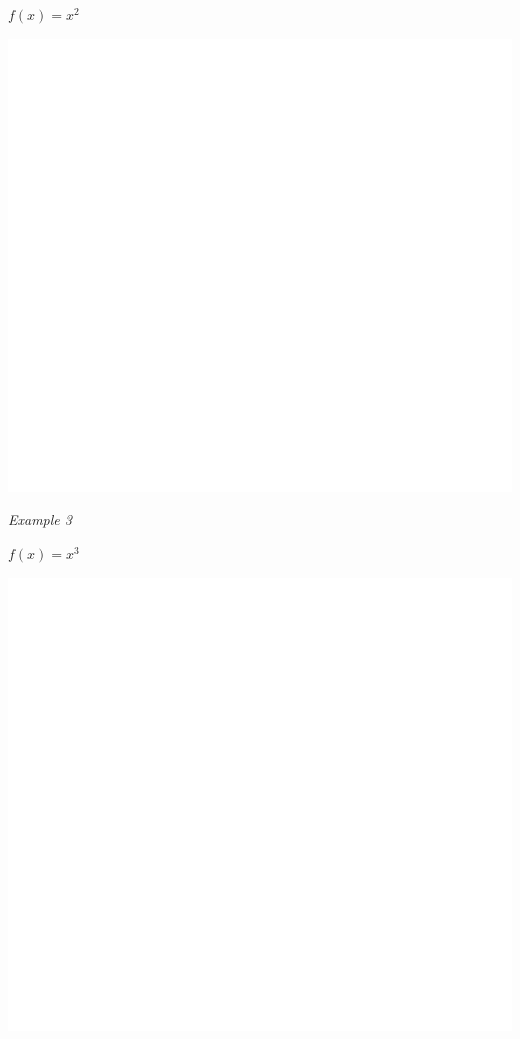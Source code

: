\documentclass[]{book}
\begin{document}
\(f(x)=x^2\)

\begin{center}\includegraphics[width=1\linewidth]{figure/LB4-1} \end{center}

\newpage

\emph{Example 3}

\(f(x)=x^3\)

\begin{center}\includegraphics[width=1\linewidth]{figure/LB5-1} \end{center}
\end{document}
